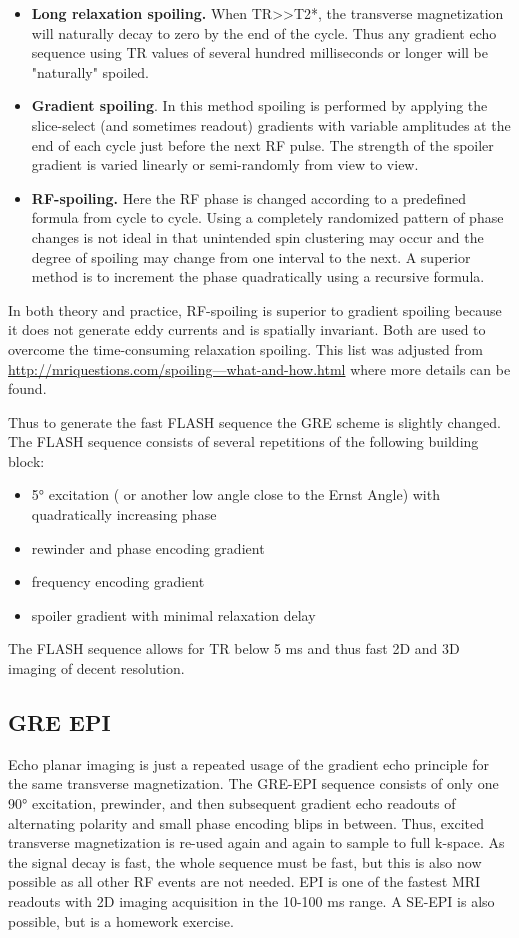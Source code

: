 \documentclass[a4paper,12pt]{extarticle}
\begin{document}
\begin{itemize}
\item \textbf{Long relaxation spoiling.}  When TR>>T2*, the transverse magnetization will naturally decay to zero by the end of the cycle.  Thus any gradient echo sequence using TR values of several hundred milliseconds or longer will be "naturally" spoiled. 
\item \textbf{Gradient spoiling}.  In this method spoiling is performed by applying the slice-select (and sometimes readout) gradients with variable amplitudes at the end of each cycle just before the next RF pulse.  The strength of the spoiler gradient is varied linearly or semi-randomly from view to view. 
\item \textbf{RF-spoiling.}  Here the RF phase  is changed according to a predefined formula from cycle to cycle. Using a completely randomized pattern of phase changes is not ideal in that unintended spin clustering may occur and the degree of spoiling may change from one interval to the next. A superior method is to increment the phase quadratically using a recursive formula. 
\end{itemize}
In both theory and practice, RF-spoiling is superior to gradient spoiling because it does not generate eddy currents and is spatially invariant.  Both are used to overcome the time-consuming relaxation spoiling.
This list was adjusted from \href{http://mriquestions.com/spoiling---what-and-how.html}{http://mriquestions.com/spoiling---what-and-how.html} where more details can be found.

Thus to generate the fast FLASH sequence the GRE scheme is slightly changed. The FLASH sequence consists of several repetitions of the following building block: 
\begin{itemize}
\item 5° excitation ( or another low angle close to the Ernst Angle) with quadratically increasing phase 
\item rewinder and phase encoding gradient 
\item frequency encoding gradient
\item spoiler gradient with minimal relaxation delay
\end{itemize}
The FLASH sequence allows for TR below 5 ms and thus fast 2D and 3D imaging of decent resolution.

\subsection{GRE EPI}
Echo planar imaging is just a repeated usage of the gradient echo principle for the same transverse magnetization. The GRE-EPI sequence consists of only one 90° excitation, prewinder, and then subsequent gradient echo readouts of alternating polarity and small phase encoding blips in between. Thus, excited transverse magnetization is re-used again and again to sample to full k-space. As the signal decay is fast, the whole sequence must be fast, but this is also now possible as all other RF events are not needed. 
EPI is one of the fastest MRI readouts with 2D imaging acquisition in the 10-100 ms range.
A SE-EPI is also possible, but is a homework exercise.
\end{document}
